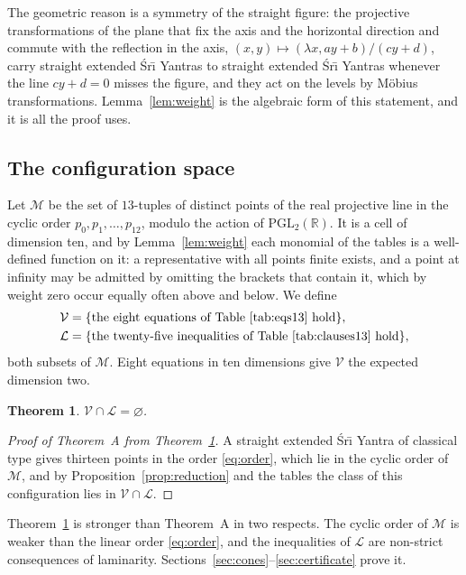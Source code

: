\documentclass[11pt,a4paper]{article}
\newtheorem{theorem}{Theorem}[section]
\theoremstyle{definition}
\theoremstyle{remark}
\newcommand{\Sri}{\'Sr\={\i}}
\newcommand{\Mo}{\mathcal{M}}
\newcommand{\V}{\mathcal{V}}
\newcommand{\Lam}{\mathcal{L}}
\begin{document}
The geometric reason is a symmetry of the straight figure: the projective transformations of the plane
that fix the axis and the horizontal direction and commute with the reflection in the axis,
$(x, y) \mapsto (\lambda x, ay + b)/(cy + d)$, carry straight extended \Sri{} Yantras to straight extended
\Sri{} Yantras whenever the line $cy + d = 0$ misses the figure, and they act on the levels by Möbius
transformations. Lemma~\ref{lem:weight} is the algebraic form of this statement, and it is all the proof
uses.

\subsection{The configuration space}
Let $\Mo$ be the set of $13$-tuples of distinct points of the real projective line in the cyclic order
$p_0, p_1, \dots, p_{12}$, modulo the action of $\mathrm{PGL}_2(\mathbb{R})$. It is a cell of dimension
ten, and by Lemma~\ref{lem:weight} each monomial of the tables is a well-defined function on it: a
representative with all points finite exists, and a point at infinity may be admitted by omitting the
brackets that contain it, which by weight zero occur equally often above and below. We define
\begin{align*}
\V &= \{\text{the eight equations of Table~\ref{tab:eqs13} hold}\},\\
\Lam &= \{\text{the twenty-five inequalities of Table~\ref{tab:clauses13} hold}\},
\end{align*}
both subsets of $\Mo$. Eight equations in ten dimensions give $\V$ the expected dimension two.

\begin{theorem}\label{thm:main}
$\V \cap \Lam = \varnothing$.
\end{theorem}

\begin{proof}[Proof of Theorem~A from Theorem~\ref{thm:main}]
A straight extended \Sri{} Yantra of classical type gives thirteen points in the order \eqref{eq:order},
which lie in the cyclic order of $\Mo$, and by Proposition~\ref{prop:reduction} and the tables the class
of this configuration lies in $\V \cap \Lam$.
\end{proof}

Theorem~\ref{thm:main} is stronger than Theorem~A in two respects. The cyclic order of $\Mo$ is weaker than
the linear order \eqref{eq:order}, and the inequalities of $\Lam$ are non-strict consequences of
laminarity. Sections~\ref{sec:cones}--\ref{sec:certificate} prove it.
\end{document}
